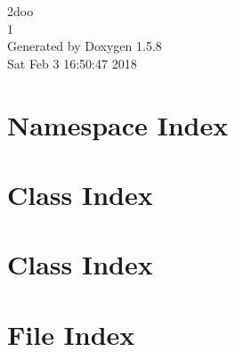 \documentclass[a4paper]{book}
\begin{document}
\begin{titlepage}
\vspace*{7cm}
\begin{center}
{\Large 2doo \\[1ex]\large 1 }\\
\vspace*{1cm}
{\large Generated by Doxygen 1.5.8}\\
\vspace*{0.5cm}
{\small Sat Feb 3 16:50:47 2018}\\
\end{center}
\end{titlepage}
\clearemptydoublepage
{}
\tableofcontents
\clearemptydoublepage
{}
\chapter{Namespace Index}

\chapter{Class Index}

\chapter{Class Index}

\chapter{File Index}

\end{document}
